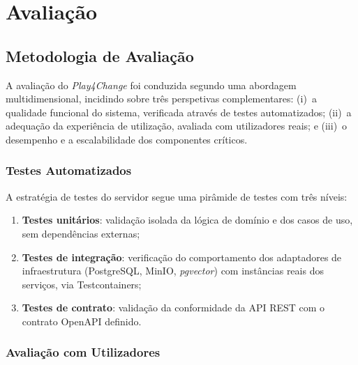 %
%
\chapter{Avaliação}
\label{cha:avaliacao}

\section{Metodologia de Avaliação}
\label{sec:metodologia}

A avaliação do \textit{Play4Change} foi conduzida segundo uma abordagem multidimensional, incidindo sobre três perspetivas complementares: (i)~a qualidade funcional do sistema, verificada através de testes automatizados; (ii)~a adequação da experiência de utilização, avaliada com utilizadores reais; e (iii)~o desempenho e a escalabilidade dos componentes críticos.

\subsection{Testes Automatizados}
\label{ssec:testes_automatizados}

A estratégia de testes do servidor segue uma pirâmide de testes com três níveis:

\begin{enumerate}
  \item \textbf{Testes unitários}: validação isolada da lógica de domínio e dos casos de uso, sem dependências externas;
  \item \textbf{Testes de integração}: verificação do comportamento dos adaptadores de infraestrutura (PostgreSQL, MinIO, \textit{pgvector}) com instâncias reais dos serviços, via Testcontainers;
  \item \textbf{Testes de contrato}: validação da conformidade da API REST com o contrato OpenAPI definido.
\end{enumerate}


\subsection{Avaliação com Utilizadores}
\label{ssec:avaliacao_utilizadores}


